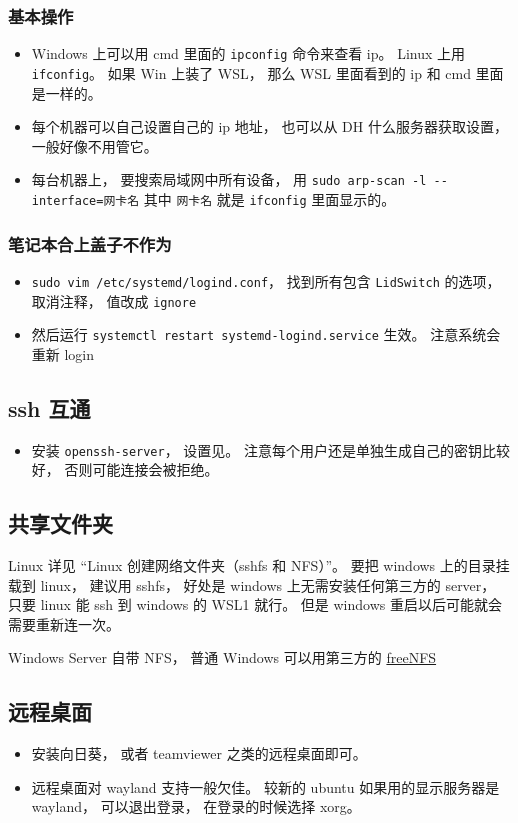 \subsubsection{基本操作}
\begin{itemize}
\item Windows 上可以用 cmd 里面的 \verb|ipconfig| 命令来查看 ip。 Linux 上用 \verb|ifconfig|。 如果 Win 上装了 WSL， 那么 WSL 里面看到的 ip 和 cmd 里面是一样的。
\item 每个机器可以自己设置自己的 ip 地址， 也可以从 DH 什么服务器获取设置， 一般好像不用管它。
\item 每台机器上， 要搜索局域网中所有设备， 用 \verb|sudo arp-scan -l --interface=网卡名| 其中 \verb|网卡名| 就是 \verb|ifconfig| 里面显示的。
\end{itemize}

\subsubsection{笔记本合上盖子不作为}
\begin{itemize}
\item \verb|sudo vim /etc/systemd/logind.conf|， 找到所有包含 \verb|LidSwitch| 的选项， 取消注释， 值改成 \verb|ignore|
\item 然后运行 \verb|systemctl restart systemd-logind.service| 生效。 注意系统会重新 login
\end{itemize}


\subsection{ssh 互通}
\begin{itemize}
\item 安装 \verb|openssh-server|， 设置见。 注意每个用户还是单独生成自己的密钥比较好， 否则可能连接会被拒绝。
\end{itemize}

\subsection{共享文件夹}
Linux 详见 “Linux 创建网络文件夹（sshfs 和 NFS）”。 要把 windows 上的目录挂载到 linux， 建议用 sshfs， 好处是 windows 上无需安装任何第三方的 server， 只要 linux 能 ssh 到 windows 的 WSL1 就行。 但是 windows 重启以后可能就会需要重新连一次。

Windows Server 自带 NFS， 普通 Windows 可以用第三方的 \href{https://sourceforge.net/projects/freenfs/files/latest/download}{freeNFS}

\subsection{远程桌面}
\begin{itemize}
\item 安装向日葵， 或者 teamviewer 之类的远程桌面即可。
\item 远程桌面对 wayland 支持一般欠佳。 较新的 ubuntu 如果用的显示服务器是 wayland， 可以退出登录， 在登录的时候选择 xorg。
\end{itemize}

